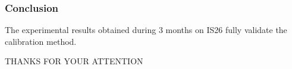 \documentclass[handout,10pt]{beamer}
\newcommand{\figsstit}[2]{
\begin{figure}[hbtp]
\centerline{
    \hbox{ \epsfig{figure={#1}, scale=#2} }
}
\end{figure}}
\begin{document}
%
%
%
\begin{frame}
\frametitle{Conclusion}

The experimental results obtained during 3 months on IS26 fully validate the calibration method.

\end{frame}

\begin{frame}
\begin{center}
{\large THANKS FOR YOUR ATTENTION}
\end{center}
\end{frame}
\end{document}
